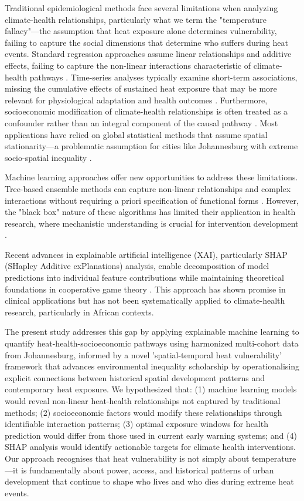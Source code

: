 \documentclass[11pt,a4paper]{article}
\begin{document}
Traditional epidemiological methods face several limitations when analyzing climate-health relationships, particularly what we term the "temperature fallacy"—the assumption that heat exposure alone determines vulnerability, failing to capture the social dimensions that determine who suffers during heat events. Standard regression approaches assume linear relationships and additive effects, failing to capture the non-linear interactions characteristic of climate-health pathways \cite{gasparrini2015mortality}. Time-series analyses typically examine short-term associations, missing the cumulative effects of sustained heat exposure that may be more relevant for physiological adaptation and health outcomes \cite{armstrong2014models}. Furthermore, socioeconomic modification of climate-health relationships is often treated as a confounder rather than an integral component of the causal pathway \cite{reid2009mapping}. Most applications have relied on global statistical methods that assume spatial stationarity—a problematic assumption for cities like Johannesburg with extreme socio-spatial inequality \cite{harris2011geographically}.

Machine learning approaches offer new opportunities to address these limitations. Tree-based ensemble methods can capture non-linear relationships and complex interactions without requiring a priori specification of functional forms \cite{chen2016xgboost,breiman2001random}. However, the "black box" nature of these algorithms has limited their application in health research, where mechanistic understanding is crucial for intervention development \cite{murdoch2019definitions}.

Recent advances in explainable artificial intelligence (XAI), particularly SHAP (SHapley Additive exPlanations) analysis, enable decomposition of model predictions into individual feature contributions while maintaining theoretical foundations in cooperative game theory \cite{lundberg2017unified}. This approach has shown promise in clinical applications \cite{chen2020machine} but has not been systematically applied to climate-health research, particularly in African contexts.

The present study addresses this gap by applying explainable machine learning to quantify heat-health-socioeconomic pathways using harmonized multi-cohort data from Johannesburg, informed by a novel 'spatial-temporal heat vulnerability' framework that advances environmental inequality scholarship by operationalising explicit connections between historical spatial development patterns and contemporary heat exposure. We hypothesized that: (1) machine learning models would reveal non-linear heat-health relationships not captured by traditional methods; (2) socioeconomic factors would modify these relationships through identifiable interaction patterns; (3) optimal exposure windows for health prediction would differ from those used in current early warning systems; and (4) SHAP analysis would identify actionable targets for climate health interventions. Our approach recognises that heat vulnerability is not simply about temperature—it is fundamentally about power, access, and historical patterns of urban development that continue to shape who lives and who dies during extreme heat events.
\end{document}
